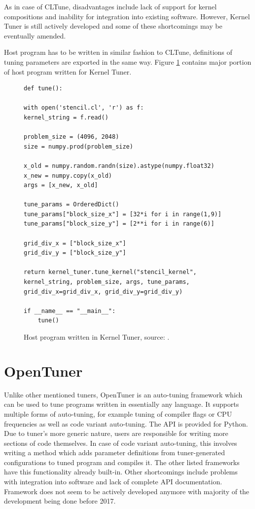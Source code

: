 \documentclass
[
    digital, %
    oneside, %
    table, %
    nolof, %
    nolot, %
    nocover %
]{fithesis3}
\begin{document}
As in case of CLTune, disadvantages include lack of support for kernel compositions and inability for integration into existing software. However,
Kernel Tuner is still actively developed and some of these shortcomings may be eventually amended.

Host program has to be written in similar fashion to CLTune, definitions of tuning parameters are exported in the same way. Figure \ref{kerneltuner-example}
contains major portion of host program written for Kernel Tuner.
\begin{figure}[ht]
\begin{adjustwidth}{-1cm}{-1cm}
\begin{lstlisting}
def tune():

with open('stencil.cl', 'r') as f:
kernel_string = f.read()

problem_size = (4096, 2048)
size = numpy.prod(problem_size)

x_old = numpy.random.randn(size).astype(numpy.float32)
x_new = numpy.copy(x_old)
args = [x_new, x_old]

tune_params = OrderedDict()
tune_params["block_size_x"] = [32*i for i in range(1,9)]
tune_params["block_size_y"] = [2**i for i in range(6)]

grid_div_x = ["block_size_x"]
grid_div_y = ["block_size_y"]

return kernel_tuner.tune_kernel("stencil_kernel", kernel_string, problem_size, args, tune_params, grid_div_x=grid_div_x, grid_div_y=grid_div_y)

if __name__ == "__main__":
    tune()
\end{lstlisting}
\caption{Host program written in Kernel Tuner, source: \cite{kerneltuner-example}.}
\label{kerneltuner-example}
\end{adjustwidth}
\end{figure}

\section{OpenTuner}
Unlike other mentioned tuners, OpenTuner \cite{opentuner} is an auto-tuning framework which can be used to tune programs written in essentially any
language. It supports multiple forms of auto-tuning, for example tuning of compiler flags or CPU frequencies as well as code variant auto-tuning. The
API is provided for Python. Due to tuner's more generic nature, users are responsible for writing more sections of code themselves. In case of code
variant auto-tuning, this involves writing a method which adds parameter definitions from tuner-generated configurations to tuned program and compiles
it. The other listed frameworks have this functionality already built-in. Other shortcomings include problems with integration into software and lack of
complete API documentation. Framework does not seem to be actively developed anymore with majority of the development being done before 2017.
\end{document}

